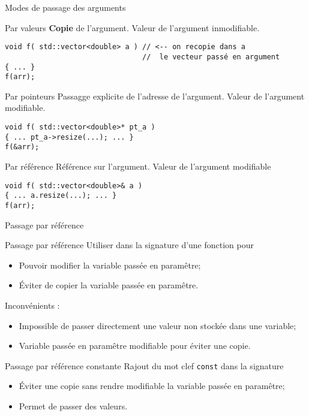 \documentclass[handout,10pt]{beamer}
\begin{document}
\begin{frame}[fragile]{Modes de passage des arguments}
\tiny
\begin{block}{Par valeurs}
\textbf{Copie} de l'argument. Valeur de
l'argument inmodifiable.
\begin{lstlisting}
void f( std::vector<double> a ) // <-- on recopie dans a
                                //  le vecteur passé en argument
{ ... }
f(arr);
\end{lstlisting}
\end{block}

\begin{block}{Par pointeurs}
Passagge explicite de l'adresse de l'argument. Valeur de l'argument modifiable.
\begin{lstlisting}
void f( std::vector<double>* pt_a )
{ ... pt_a->resize(...); ... }
f(&arr);
\end{lstlisting}
\end{block}

\begin{block}{Par référence}
Référence sur l'argument. Valeur de l'argument modifiable
\begin{lstlisting}
void f( std::vector<double>& a )
{ ... a.resize(...); ... }
f(arr);
\end{lstlisting}
\end{block}
\end{frame}

\begin{frame}[fragile]{Passage par référence}
\tiny
\begin{block}{Passage par référence}
Utiliser dans la signature d'une fonction pour
\begin{itemize}
\item Pouvoir modifier la variable passée en paramêtre;
\item Éviter de copier la variable passée en paramêtre.
\end{itemize}
Inconvénients :
\begin{itemize}
\item Impossible de passer directement une valeur non stockée dans une variable;
\item Variable passée en paramêtre modifiable pour éviter une copie.
\end{itemize}
\end{block}

\begin{block}{Passage par référence constante}
Rajout du mot clef \lstinline{const} dans la signature
\begin{itemize}
\item Éviter une copie sans rendre modifiable la variable passée en paramêtre;
\item Permet de passer des valeurs.
\end{itemize}
\end{block}
\end{frame}
\end{document}
